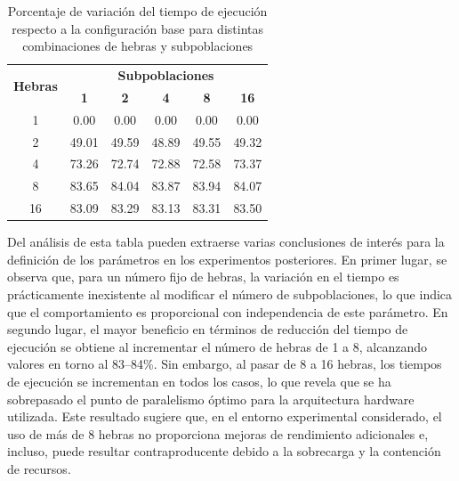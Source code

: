 \begin{table}[ht]
    \centering
    \begin{tabular}{|c|ccccc|}
        \hline
        \multirow{2}{*}{\textbf{Hebras}} & \multicolumn{5}{c|}{\textbf{Subpoblaciones}}                                                      \\ \cline{2-6}
                                         & \textbf{1}                                   & \textbf{2} & \textbf{4} & \textbf{8} & \textbf{16} \\ \hline
        1                                & 0.00                                         & 0.00       & 0.00       & 0.00       & 0.00        \\ \hline
        2                                & 49.01                                        & 49.59      & 48.89      & 49.55      & 49.32       \\ \hline
        4                                & 73.26                                        & 72.74      & 72.88      & 72.58      & 73.37       \\ \hline
        8                                & 83.65                                        & 84.04      & 83.87      & 83.94      & 84.07       \\ \hline
        16                               & 83.09                                        & 83.29      & 83.13      & 83.31      & 83.50       \\ \hline
    \end{tabular}
    \caption{Porcentaje de variación del tiempo de ejecución respecto a la configuración base para distintas combinaciones de hebras y subpoblaciones}
    \label{tab:exploratory_populations_delta}
\end{table}

Del análisis de esta tabla pueden extraerse varias conclusiones de interés para la definición de los parámetros en los experimentos posteriores. En primer lugar, se observa que, para un número fijo de hebras, la variación en el tiempo es prácticamente inexistente al modificar el número de subpoblaciones, lo que indica que el comportamiento es proporcional con independencia de este parámetro. En segundo lugar, el mayor beneficio en términos de reducción del tiempo de ejecución se obtiene al incrementar el número de hebras de 1 a 8, alcanzando valores en torno al 83--84\%. Sin embargo, al pasar de 8 a 16 hebras, los tiempos de ejecución se incrementan en todos los casos, lo que revela que se ha sobrepasado el punto de paralelismo óptimo para la arquitectura hardware utilizada. Este resultado sugiere que, en el entorno experimental considerado, el uso de más de 8 hebras no proporciona mejoras de rendimiento adicionales e, incluso, puede resultar contraproducente debido a la sobrecarga y la contención de recursos.

